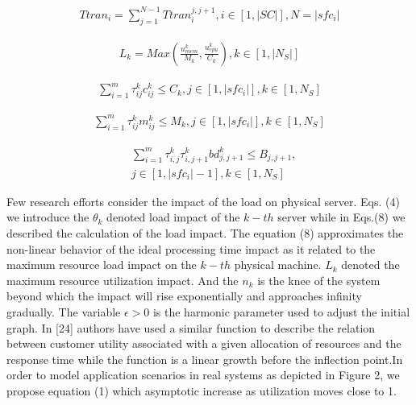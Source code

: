 \documentclass{ieeeaccess}
\begin{document}
\begin{equation}
  \begin{aligned}
Ttran_{i}=\sum_{j=1}^{N-1}Ttran_{i}^{j,j+1},i \in \left [ 1,|SC| \right ],N=|sfc_{i}|
  \end{aligned}
\end{equation}

\begin{equation}
  \begin{aligned}
  L_{k}=Max(\frac{u_{mem}^{k}}{M_{k}},\frac{u_{cpu}^{k}}{C_{k}}),k \in \left [ 1,|N_{S}| \right ]
  \end{aligned}
\end{equation}

\begin{equation}
\begin{aligned}
\sum_{i=1}^{m}\tau _{ij}^{k}c_{ij}^{k}\leq C_{k},j \in \left [ 1,|sfc_{i}| \right ],k \in \left [ 1,N_{S} \right ]
\end{aligned}
\end{equation}

\begin{equation}
\begin{aligned}
\sum_{i=1}^{m}\tau _{ij}^{k}m_{ij}^{k}\leq M_{k},j \in \left [ 1,|sfc_{i}| \right ],k \in \left [ 1,N_{S} \right ]
\end{aligned}
\end{equation}

\begin{equation}
\begin{aligned}
&\sum_{i=1}^{m}\tau _{i,j}^{k}\tau _{i,j+1}^{k}bd_{j,j+1}^{k}\leq B_{j,j+1},\\
&j\in \left [ 1,|sfc_{i}|-1 \right ],k \in \left [ 1,N_{S} \right ]
\end{aligned}
\end{equation}

Few research efforts consider the impact of the load on physical server. Eqs. (4) we introduce the $\theta _{k}$ denoted load impact of the $k-th$ server while in Eqs.(8)  we described the calculation of the load impact. The equation (8) approximates the non-linear behavior of the ideal processing time impact as it related to the maximum resource load impact on the $k-th$ physical machine. $L_{k}$ denoted the maximum resource utilization impact. And the $n_{k}$ is the knee of the system beyond which the impact will rise exponentially and approaches infinity gradually. The variable $\epsilon >0$  is the harmonic parameter used to adjust the initial graph. In [24] authors have used a similar function to describe the relation between customer utility associated with a given allocation of resources and the response time while the function is a linear growth before the inflection point.In order to model application scenarios in real systems as depicted in Figure 2, we propose equation (1) which asymptotic increase as utilization moves close to 1.
\end{document}
